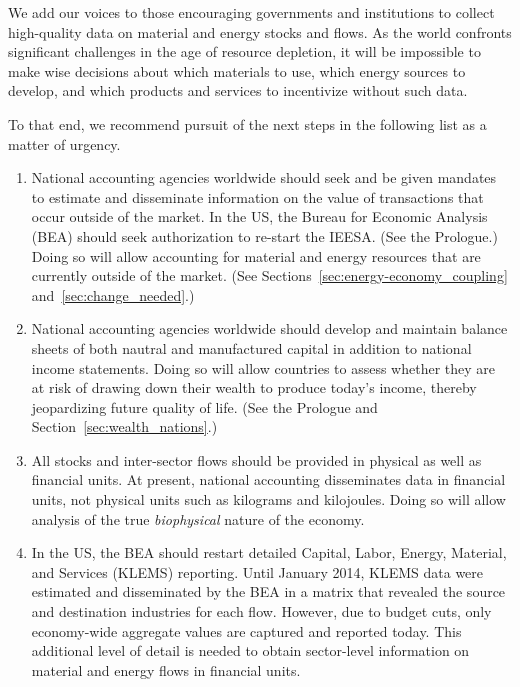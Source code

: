 We add our voices to those encouraging governments and 
institutions to collect high-quality data on material 
and energy stocks and flows.
As the world confronts significant challenges
in the age of resource depletion,
it will be impossible to make wise decisions about
which materials to use,
which energy sources to develop, and 
which products and services to incentivize
without such data.

To that end, we recommend pursuit of the next steps in the following list
as a matter of urgency.


\begin{enumerate}
	
	\item{National accounting agencies worldwide should seek and be given
			mandates to estimate and disseminate information on 
			the value of transactions that occur outside of the market.
			In the US, the Bureau for Economic Analysis (BEA) should seek authorization 
			to re-start the IEESA. 
			(See the Prologue.)
			Doing so will allow accounting for material and energy resources
			that are currently outside of the market.
			(See Sections~\ref{sec:energy-economy_coupling}
			and~\ref{sec:change_needed}.)}

	\item{National accounting agencies worldwide should develop and maintain 
			balance sheets of both nautral and manufactured capital 
			in addition to national income statements.
			Doing so will allow countries to assess whether they are at risk of drawing down
			their wealth to produce today's income, 
			thereby jeopardizing future quality of life.
			(See the Prologue and Section~\ref{sec:wealth_nations}.)}

	\item{All stocks and inter-sector flows should be provided 
			in physical as well as financial units.
			At present, national accounting disseminates data in financial units,
			not physical units such as kilograms and kilojoules.
			Doing so will allow analysis of the true 
			\emph{biophysical} nature of the economy.}

	\item{In the US, the BEA should restart detailed 
			Capital, Labor, Energy, Material, and Services (KLEMS)
			reporting.
			Until January 2014, KLEMS data were estimated and disseminated by the BEA
			in a matrix that revealed the source and destination industries
			for each flow. 
			However, due to budget cuts, only economy-wide aggregate values are 
			captured and reported today.
			This additional level of detail is needed to
			obtain sector-level information 
			on material and energy flows
			in financial units.}


\end{enumerate}
